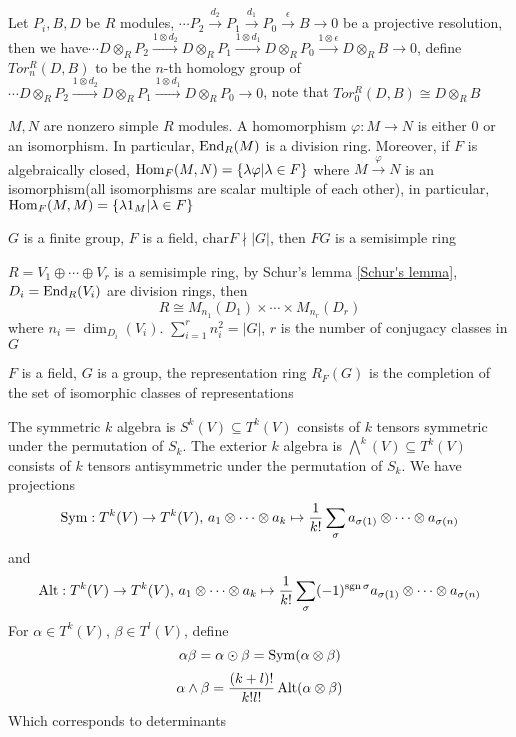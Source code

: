 \documentclass[main]{subfiles}
\begin{document}
\begin{definition}
Let $P_i,B,D$ be $R$ modules, $\cdots P_2\xrightarrow{d_2}P_1\xrightarrow{d_1}P_0\xrightarrow{\epsilon}B\to0$ be a projective resolution, then we have$\cdots D\otimes_RP_2\xrightarrow{1\otimes d_2}D\otimes_RP_1\xrightarrow{1\otimes d_1}D\otimes_RP_0\xrightarrow{1\otimes\epsilon}D\otimes_RB\to0$, define $Tor^R_n(D,B)$ to be the $n$-th homology group of $\cdots D\otimes_RP_2\xrightarrow{1\otimes d_2}D\otimes_RP_1\xrightarrow{1\otimes d_1}D\otimes_RP_0\to0$, note that $Tor^R_0(D,B)\cong D\otimes_RB$
\end{definition}

\begin{lemma}\label{Schur's lemma}
$M,N$ are nonzero simple $R$ modules. A homomorphism $\varphi: M\to N$ is either $0$ or an isomorphism. In particular, $\operatorname{End}_R(M)$ is a division ring. Moreover, if $F$ is algebraically closed, $\operatorname{Hom}_F(M,N)=\{\lambda\varphi|\lambda\in F\}$ where $M\xrightarrow{\varphi}N$ is an isomorphism(all isomorphisms are scalar multiple of each other), in particular, $\operatorname{Hom}_F(M,M)=\{\lambda 1_M|\lambda\in F\}$
\end{lemma}

\begin{theorem}
$G$ is a finite group, $F$ is a field, $\mathrm{char} F\nmid |G|$, then $FG$ is a semisimple ring
\end{theorem}

\begin{theorem}
$R=V_1\oplus\cdots\oplus V_r$ is a semisimple ring, by Schur's lemma \ref{Schur's lemma}, $D_i=\operatorname{End}_R(V_i)$ are division rings, then
\[R\cong M_{n_1}(D_1)\times\cdots\times M_{n_r}(D_r)\]
where $n_i=\dim_{D_i}(V_i)$. $\displaystyle\sum_{i=1}^rn_i^2=|G|$, $r$ is the number of conjugacy classes in $G$
\end{theorem}

\begin{definition}
$F$ is a field, $G$ is a group, the representation ring $R_F(G)$ is the completion of the set of isomorphic classes of representations
\end{definition}

\begin{definition}
The symmetric $k$ algebra is $S^k(V)\subseteq T^k(V)$ consists of $k$ tensors symmetric under the permutation of $S_k$. The exterior $k$ algebra is $\bigwedge^k(V)\subseteq T^k(V)$ consists of $k$ tensors antisymmetric under the permutation of $S_k$. We have projections
\[\operatorname{Sym}:T^k(V)\to T^k(V),\,a_1\otimes\cdots\otimes a_k\mapsto\frac{1}{k!}\sum_\sigma a_{\sigma(1)}\otimes\cdots\otimes a_{\sigma(n)}\]
and
\[\operatorname{Alt}:T^k(V)\to T^k(V),\,a_1\otimes\cdots\otimes a_k\mapsto\frac{1}{k!}\sum_\sigma(-1)^{\operatorname{sgn}\sigma} a_{\sigma(1)}\otimes\cdots\otimes a_{\sigma(n)}\]
For $\alpha\in T^k(V)$, $\beta\in T^l(V)$, define
\[\alpha\beta=\alpha\odot\beta=\operatorname{Sym}(\alpha\otimes\beta)\]
\[\alpha\wedge\beta=\frac{(k+l)!}{k!l!}\operatorname{Alt}(\alpha\otimes\beta)\]
Which corresponds to determinants
\end{definition}
\end{document}
